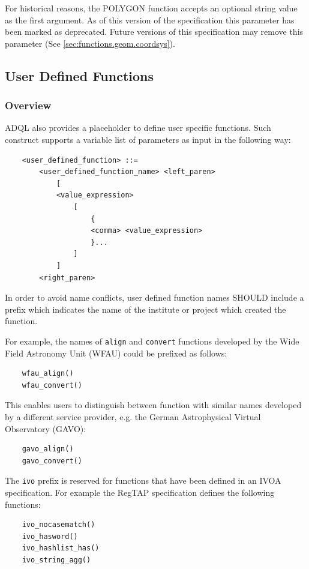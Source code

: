 \documentclass[11pt,a4paper]{ivoa}
\newcommand{\RegTAPspec}{RegTAP specification\xspace}
\begin{document}
For historical reasons, the POLYGON function accepts an optional string
value as the first argument.
As of this version of the specification this parameter has been
marked as deprecated.
Future versions of this specification may remove this parameter
(See \ref{sec:functions.geom.coordsys}).

\subsection{User Defined Functions}
\label{sec:user.functions}
\subsubsection{Overview}

ADQL also provides a placeholder to define user specific functions. Such
construct supports a variable list of parameters as input in the following way:
\begin{verbatim}
    <user_defined_function> ::=
        <user_defined_function_name> <left_paren>
            [
            <value_expression>
                [
                    {
                    <comma> <value_expression>
                    }...
                ]
            ]
        <right_paren>
\end{verbatim}

In order to avoid name conflicts, user defined function names SHOULD include
a prefix which indicates the name of the institute or project which created
the function.

For example, the names of \verb:align: and \verb:convert: functions developed
by the Wide Field Astronomy Unit (WFAU) could be prefixed as follows:
\begin{verbatim}
    wfau_align()
    wfau_convert()
\end{verbatim}

This enables users to distinguish between function with similar names developed
by a different service provider, e.g. the German Astrophysical Virtual
Observatory (GAVO):
\begin{verbatim}
    gavo_align()
    gavo_convert()
\end{verbatim}

The \verb:ivo: prefix is reserved for functions that have been defined
in an IVOA specification. For example the \RegTAPspec defines the following
functions:
\begin{verbatim}
    ivo_nocasematch()
    ivo_hasword()
    ivo_hashlist_has()
    ivo_string_agg()
\end{verbatim}
\end{document}
